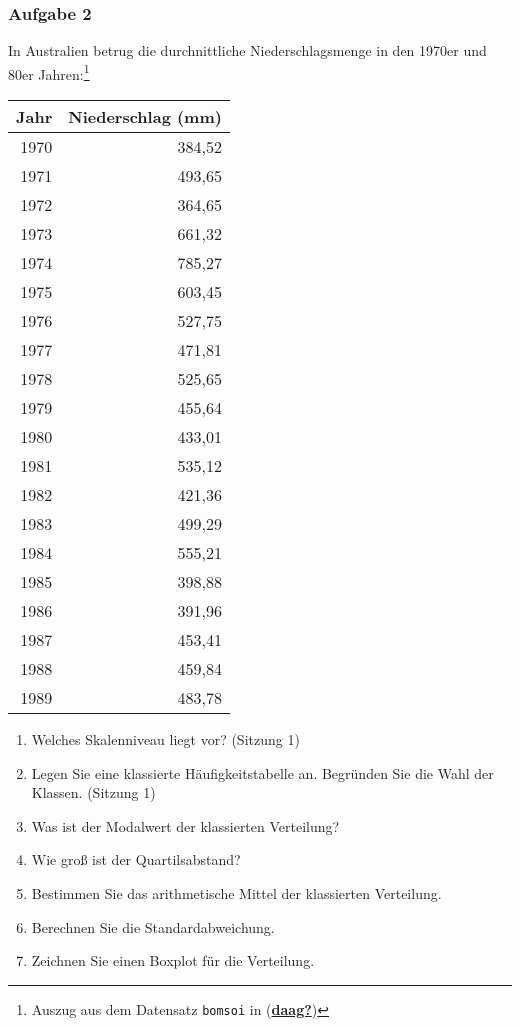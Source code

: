 \documentclass[
  ngerman,
]{article}
\providecommand{\tightlist}{%
  \setlength{\itemsep}{0pt}\setlength{\parskip}{0pt}}
\begin{document}
\hypertarget{aufgabe-2-1}{%
\subsubsection{Aufgabe 2}\label{aufgabe-2-1}}

In Australien betrug die durchnittliche Niederschlagsmenge in den 1970er und 80er Jahren:\footnote{Auszug aus dem Datensatz \texttt{bomsoi} in (\protect\hyperlink{ref-daag}{\textbf{daag?}})}
\nopagebreak

\begin{table}
\centering\begingroup\fontsize{8}{10}\selectfont

\begin{tabular}{rr}
\toprule
Jahr & Niederschlag (mm)\\
\midrule
1970 & 384,52\\
1971 & 493,65\\
1972 & 364,65\\
1973 & 661,32\\
1974 & 785,27\\
1975 & 603,45\\
1976 & 527,75\\
1977 & 471,81\\
1978 & 525,65\\
1979 & 455,64\\
1980 & 433,01\\
1981 & 535,12\\
1982 & 421,36\\
1983 & 499,29\\
1984 & 555,21\\
1985 & 398,88\\
1986 & 391,96\\
1987 & 453,41\\
1988 & 459,84\\
1989 & 483,78\\
\bottomrule
\end{tabular}
\endgroup{}
\end{table}

\begin{enumerate}
\def\labelenumi{\alph{enumi})}
\tightlist
\item
  Welches Skalenniveau liegt vor? (Sitzung 1)
\item
  Legen Sie eine klassierte Häufigkeitstabelle an. Begründen Sie die Wahl der Klassen. (Sitzung 1)
\item
  Was ist der Modalwert der klassierten Verteilung?
\item
  Wie groß ist der Quartilsabstand?
\item
  Bestimmen Sie das arithmetische Mittel der klassierten Verteilung.
\item
  Berechnen Sie die Standardabweichung.
\item
  Zeichnen Sie einen Boxplot für die Verteilung.
\end{enumerate}
\end{document}
